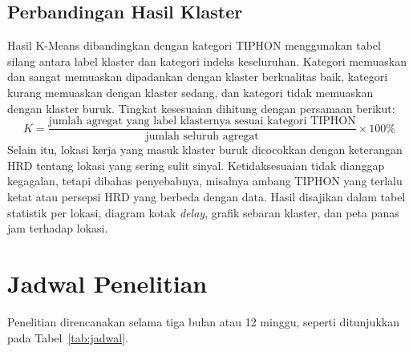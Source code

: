 \subsection{Perbandingan Hasil Klaster}
Hasil K-Means dibandingkan dengan kategori TIPHON menggunakan tabel silang antara label klaster dan kategori indeks keseluruhan. Kategori memuaskan dan sangat memuaskan dipadankan dengan klaster berkualitas baik, kategori kurang memuaskan dengan klaster sedang, dan kategori tidak memuaskan dengan klaster buruk. Tingkat kesesuaian dihitung dengan persamaan berikut:
\begin{equation}
K = \frac{\text{jumlah agregat yang label klasternya sesuai kategori TIPHON}}{\text{jumlah seluruh agregat}} \times 100\%
\label{eq:kesesuaian}
\end{equation}
Selain itu, lokasi kerja yang masuk klaster buruk dicocokkan dengan keterangan HRD tentang lokasi yang sering sulit sinyal. Ketidaksesuaian tidak dianggap kegagalan, tetapi dibahas penyebabnya, misalnya ambang TIPHON yang terlalu ketat atau persepsi HRD yang berbeda dengan data. Hasil disajikan dalam tabel statistik per lokasi, diagram kotak \textit{delay}, grafik sebaran klaster, dan peta panas jam terhadap lokasi.

\section{Jadwal Penelitian}
\label{sec:jadwal}
Penelitian direncanakan selama tiga bulan atau 12 minggu, seperti ditunjukkan pada Tabel~\ref{tab:jadwal}.


